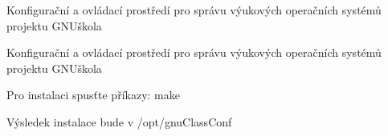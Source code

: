 Konfigurační a ovládací prostředí pro správu výukových operačních systémů projektu G\-N\-Uškola

Konfigurační a ovládací prostředí pro správu výukových operačních systémů projektu G\-N\-Uškola

Pro instalaci spusťte příkazy\-: make

Výsledek instalace bude v /opt/gnu\-Class\-Conf 